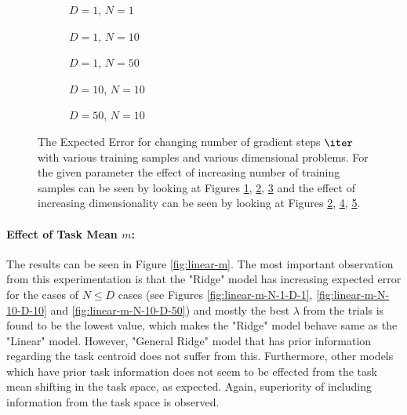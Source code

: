\begin{figure}[h!]
  \centering
    \begin{subfigure}{0.3\textwidth}
      \centering
      \caption{$D=1$, $N=1$}
      \label{fig:linear-n_iter-N-1-D-1}
    \end{subfigure}
    \begin{subfigure}{0.3\textwidth}
      \centering
      \caption{$D=1$, $N=10$}
      \label{fig:linear-n_iter-N-10-D-1}
    \end{subfigure}
    \begin{subfigure}{0.3\textwidth}
      \centering
      \caption{$D=1$, $N=50$}
      \label{fig:linear-n_iter-N-50-D-1}
    \end{subfigure}

    \begin{subfigure}{0.3\textwidth}
      \centering
      \caption{$D=10$, $N=10$}
      \label{fig:linear-n_iter-N-10-D-10}
    \end{subfigure}
    \begin{subfigure}{0.3\textwidth}
      \centering
      \caption{$D=50$, $N=10$}
      \label{fig:linear-n_iter-N-10-D-50}
    \end{subfigure}  

  \caption{The Expected Error for changing number of gradient steps $\iter$ with various training samples and various dimensional problems. For the given parameter the effect of increasing number of training samples can be seen by looking at Figures \ref{fig:linear-n_iter-N-1-D-1}, \ref{fig:linear-n_iter-N-10-D-1}, \ref{fig:linear-n_iter-N-50-D-1} and the effect of increasing dimensionality can be seen by looking at Figures \ref{fig:linear-n_iter-N-10-D-1}, \ref{fig:linear-n_iter-N-10-D-10}, \ref{fig:linear-n_iter-N-10-D-50}.}\label{fig:linear-n_iter}
\end{figure}


\paragraph{Effect of Task Mean $m$:} The results can be seen in Figure \ref{fig:linear-m}. The most important observation from this experimentation is that the "Ridge" model has increasing expected error for the cases of $N\leq D$ cases (see Figures \ref{fig:linear-m-N-1-D-1}, \ref{fig:linear-m-N-10-D-10} and \ref{fig:linear-m-N-10-D-50}) and mostly the best $\lambda$ from the trials is found to be the lowest value, which makes the "Ridge" model behave same as the "Linear" model. However, "General Ridge" model that has prior information regarding the task centroid does not suffer from this. Furthermore, other models which have prior task information does not seem to be effected from the task mean shifting in the task space, as expected. Again, superiority of including information from the task space is observed.

